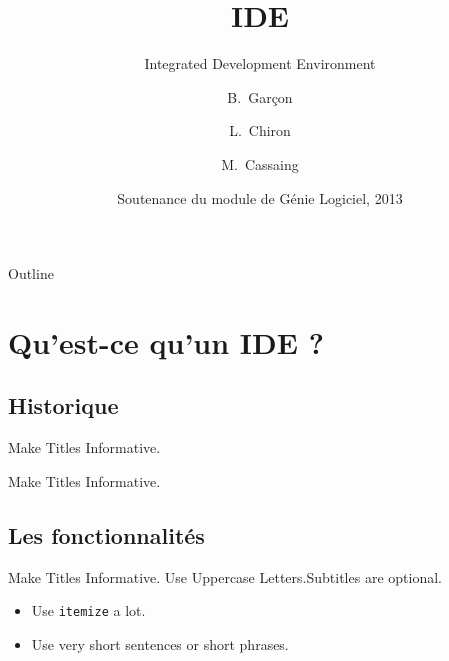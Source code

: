 \documentclass{beamer}
\title{IDE}
\subtitle
{Integrated Development Environment}
\author[Garçon, Chiron, Cassaing] %
{B.~Garçon\inst{1} \and L.~Chiron\inst{2} \and M.~Cassaing\inst{3}}
\institute[ISIMA] %
{
  \inst{1}%
  Étudiant de Prep'ISIMA
  \and
  \inst{2}%
  Étudiant de Prep'ISIMA
  \and
  \inst{3}%
  Étudiante de Prep'ISIMA}
\date[SGL 2013] %
{Soutenance du module de Génie Logiciel, 2013}
\begin{document}
\begin{frame}
  \titlepage
\end{frame}

\begin{frame}{Outline}
  \tableofcontents
\end{frame}





\section{Qu'est-ce qu'un IDE ?}

\subsection{Historique}
\begin{frame}{Make Titles Informative.}
\end{frame}

\begin{frame}{Make Titles Informative.}
\end{frame}



\subsection{Les fonctionnalités}

\begin{frame}{Make Titles Informative. Use Uppercase Letters.}{Subtitles are optional.}

  \begin{itemize}
  \item
    Use \texttt{itemize} a lot.
  \item
    Use very short sentences or short phrases.
  \end{itemize}
\end{frame}
\end{document}
